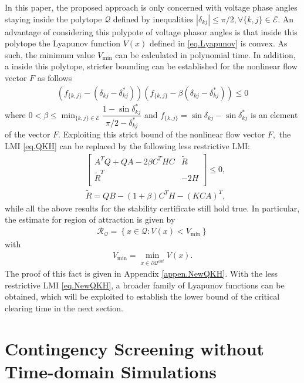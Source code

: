\documentclass[final]{IEEEtran}
\begin{document}
In this paper, the proposed approach is only concerned with voltage
phase angles staying inside the polytope $\mathcal{Q}$ defined by
inequalities $|\delta_{kj}| \le \pi/2, \forall \{k,j\} \in
\mathcal{E}.$ An advantage of considering this polypote of voltage
phasor angles is that inside this polytope the Lyapunov function
$V(x)$ defined in \eqref{eq.Lyapunov} is convex. As such, the minimum 
value $V_{\min}$ can be calculated in polynomial time. In addition, a inside 
this polytope, stricter bounding can be established for the nonlinear flow vector $F$ as follows
\begin{align}
(f_{\{k,j\}}-(\delta_{kj}-\delta_{kj}^*))(f_{\{k,j\}}-\beta(\delta_{kj}-\delta_{kj}^*))
\le 0
\end{align}
where $0<\beta \le\min_{\{k,j\}\in
\mathcal{E}}\dfrac{1-\sin\delta_{kj}^*}{\pi/2-\delta_{kj}^*}$ and
$f_{\{k,j\}}=\sin\delta_{kj}-\sin\delta_{kj}^*$ is an element of
the vector $F.$ Exploiting this strict bound of the nonlinear flow
vector $F,$ the LMI \eqref{eq.QKH} can be replaced by the following
less restrictive LMI:
\begin{align}
\label{eq.NewQKH}
    &\left[   \begin{array}{ccccc}
          A^TQ+QA-2\beta C^THC   & \tilde{R} \\
          \tilde{R}^T  & -2H\\
        \end{array}\right] \le 0, \\
       & \tilde{R}=QB-(1+\beta)C^TH-(KCA)^T, \nonumber
  \end{align}
while all the above results for the stability certificate still
hold true. In particular, the estimate for region of attraction is
given by
\begin{align}\label{eq.RoAestimate}
 \mathcal{R_Q} = \left\{x \in\mathcal{Q}: V(x) < V_{\min}\right\}
\end{align}
with 
\begin{align}
\label{eq.Vmin2}
V_{\min}=\mathop {\min}\limits_{x \in
\partial\mathcal{Q}^{out}} V(x).
\end{align} 
The proof of this fact is given
in Appendix \ref{appen.NewQKH}. With the less restrictive LMI
\eqref{eq.NewQKH}, a broader family of Lyapunov functions can be obtained,
which will be exploited to establish the lower bound of the
critical clearing time in the next section.




\section{Contingency Screening without Time-domain Simulations}
\label{sec:certificate}
\end{document}
